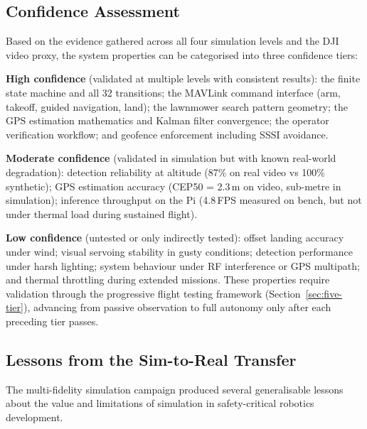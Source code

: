 \subsection{Confidence Assessment}\label{sec:confidence}

Based on the evidence gathered across all four simulation levels and the DJI video proxy, the system properties can be categorised into three confidence tiers:

\textbf{High confidence} (validated at multiple levels with consistent results): the finite state machine and all 32 transitions; the MAVLink command interface (arm, takeoff, guided navigation, land); the lawnmower search pattern geometry; the GPS estimation mathematics and Kalman filter convergence; the operator verification workflow; and geofence enforcement including SSSI avoidance.

\textbf{Moderate confidence} (validated in simulation but with known real-world degradation): detection reliability at altitude (87\% on real video vs 100\% synthetic); GPS estimation accuracy (CEP50 = 2.3\,m on video, sub-metre in simulation); inference throughput on the Pi (4.8\,FPS measured on bench, but not under thermal load during sustained flight).

\textbf{Low confidence} (untested or only indirectly tested): offset landing accuracy under wind; visual servoing stability in gusty conditions; detection performance under harsh lighting; system behaviour under RF interference or GPS multipath; and thermal throttling during extended missions. These properties require validation through the progressive flight testing framework (Section~\ref{sec:five-tier}), advancing from passive observation to full autonomy only after each preceding tier passes.

\subsection{Lessons from the Sim-to-Real Transfer}\label{sec:sim-lessons}

The multi-fidelity simulation campaign produced several generalisable lessons about the value and limitations of simulation in safety-critical robotics development.

